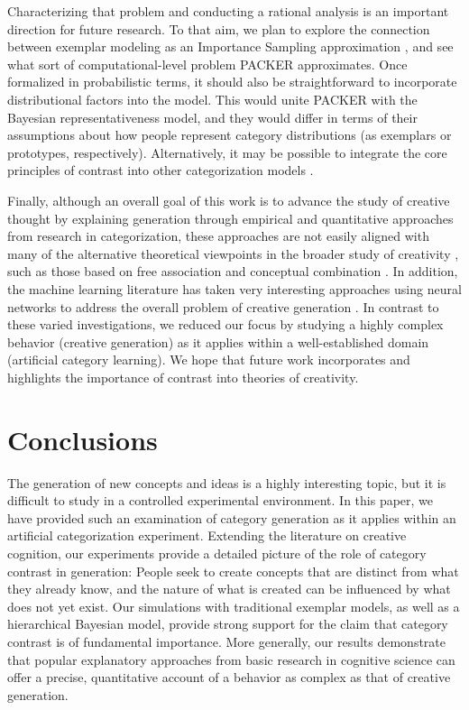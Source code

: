\documentclass[12pt]{article}
\begin{document}
\begin{flushleft}
{Characterizing that problem and conducting a rational analysis is an important
direction for future research. To that aim, we plan to explore the connection
between exemplar modeling as an Importance Sampling approximation
\citep{shi10exemplar}, and see what sort of computational-level problem PACKER
approximates. Once formalized in probabilistic terms, it should also be
straightforward to incorporate distributional factors into the model. This would
unite PACKER with the Bayesian representativeness model, and they would differ
in terms of their assumptions about how people represent category distributions
(as exemplars or prototypes, respectively). Alternatively, it may be possible to
integrate the core principles of contrast into other categorization models
\citep[e.g.,][]{love2004sustain,kurtz2007divergent,smith2000thirty}.

Finally, although an overall goal of this work is to advance the study of
creative thought by explaining generation through empirical and quantitative
approaches from research in categorization, these approaches are not easily
aligned with many of the alternative theoretical viewpoints in the broader study
of creativity \citep[for a review see][]{kozbelt2010theories}, such as those
based on free association \citep{mednick1962associative} and conceptual
combination \citep{estes2002emergence,murphy1988comprehending}. In addition, the
machine learning literature has taken very interesting approaches using neural
networks to address the overall problem of creative generation
\citep[e.g.,][]{goodfellow2014gan,ho2016gail,kingma2016,chen2016infogan}. In
contrast to these varied investigations, we reduced our focus by studying a
highly complex behavior (creative generation) as it applies within a
well-established domain (artificial category learning). We hope that future work
incorporates and highlights the importance of contrast into theories of
creativity.



\section{Conclusions}

The generation of new concepts and ideas is a highly interesting topic, but it
is difficult to study in a controlled experimental environment. In this paper,
we have provided such an examination of category generation as it applies within
an artificial categorization experiment. Extending the literature on creative
cognition, our experiments provide a detailed picture of the role of category
contrast in generation: People seek to create concepts that are distinct from
what they already know, and the nature of what is created can be influenced by
what does not yet exist. Our simulations with traditional exemplar models, as
well as a hierarchical Bayesian model, provide strong support for the claim that
category contrast is of fundamental importance. More generally, our results
demonstrate that popular explanatory approaches from basic research in cognitive
science can offer a precise, quantitative account of a behavior as complex as
that of creative generation.


}
\end{flushleft}
\end{document}
